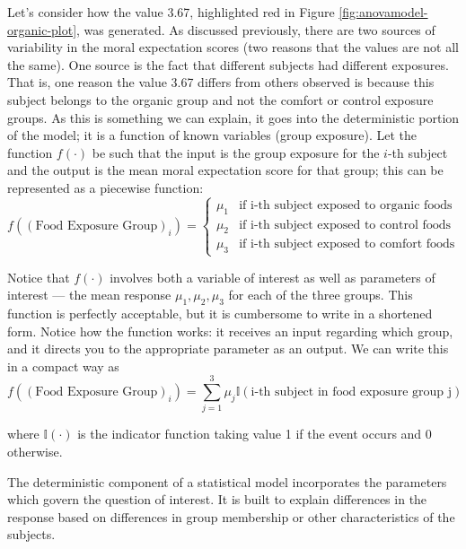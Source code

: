 \documentclass[]{book}
\theoremstyle{definition}
\theoremstyle{definition}
\theoremstyle{remark}
\let\BeginKnitrBlock\begin \let\EndKnitrBlock\end
\begin{document}
Let's consider how the value 3.67, highlighted red in Figure
\ref{fig:anovamodel-organic-plot}, was generated. As discussed
previously, there are two sources of variability in the moral
expectation scores (two reasons that the values are not all the same).
One source is the fact that different subjects had different exposures.
That is, one reason the value 3.67 differs from others observed is
because this subject belongs to the organic group and not the comfort or
control exposure groups. As this is something we can explain, it goes
into the deterministic portion of the model; it is a function of known
variables (group exposure). Let the function \(f(\cdot)\) be such that
the input is the group exposure for the \(i\)-th subject and the output
is the mean moral expectation score for that group; this can be
represented as a piecewise function: \[
f\left((\text{Food Exposure Group})_i\right) = \begin{cases}
  \mu_1 & \text{if i-th subject exposed to organic foods} \\
  \mu_2 & \text{if i-th subject exposed to control foods} \\
  \mu_3 & \text{if i-th subject exposed to comfort foods} \end{cases}
\]

Notice that \(f(\cdot)\) involves both a variable of interest as well as
parameters of interest --- the mean response \(\mu_1, \mu_2, \mu_3\) for
each of the three groups. This function is perfectly acceptable, but it
is cumbersome to write in a shortened form. Notice how the function
works: it receives an input regarding which group, and it directs you to
the appropriate parameter as an output. We can write this in a compact
way as \[
f\left((\text{Food Exposure Group})_i\right) = \sum_{j=1}^{3} \mu_j \mathbb{I}\left(\text{i-th subject in food exposure group j}\right)
\]

where \(\mathbb{I}(\cdot)\) is the indicator function taking value 1 if
the event occurs and 0 otherwise.

\BeginKnitrBlock{rmdkeyidea}
The deterministic component of a statistical model incorporates the
parameters which govern the question of interest. It is built to explain
differences in the response based on differences in group membership or
other characteristics of the subjects.
\EndKnitrBlock{rmdkeyidea}
\end{document}
